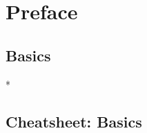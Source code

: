 \documentclass{article}
\begin{document}
\onecolumn


\clearpage

\tableofcontents
\clearpage

\section{Preface}

\clearpage

\begin{paracol}{2}
  \section{Basics}
  

  \switchcolumn[0]*
\end{paracol}

\clearpage
\begin{paracol}{1}
  \section{Cheatsheet: Basics}
  
\end{paracol}
\clearpage
\end{document}
